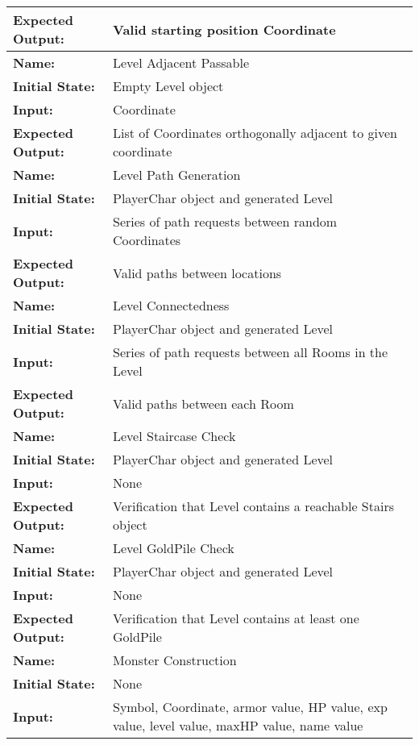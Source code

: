 \documentclass[12pt, titlepage]{article}
\begin{document}
\begin{center}
\begin{longtable}{ l | p{10cm} }
				\textbf{Expected Output:} & Valid starting position Coordinate\\[0.6em]
				\hline
				\rule{0pt}{1.5em}\textbf{Name:} & Level Adjacent Passable\\
				\textbf{Initial State:} & Empty Level object\\
				\textbf{Input:} & Coordinate\\
				\textbf{Expected Output:} & List of Coordinates orthogonally adjacent to given coordinate\\[0.6em]
				\hline
				\rule{0pt}{1.5em}\textbf{Name:} & Level Path Generation\\
				\textbf{Initial State:} & PlayerChar object and generated Level\\
				\textbf{Input:} & Series of path requests between random Coordinates\\
				\textbf{Expected Output:} & Valid paths between locations\\[0.6em]
				\hline
				\rule{0pt}{1.5em}\textbf{Name:} & Level Connectedness\\
				\textbf{Initial State:} & PlayerChar object and generated Level\\
				\textbf{Input:} & Series of path requests between all Rooms in the Level\\
				\textbf{Expected Output:} & Valid paths between each Room\\[0.6em]
				\hline
				\rule{0pt}{1.5em}\textbf{Name:} & Level Staircase Check\\
				\textbf{Initial State:} & PlayerChar object and generated Level\\
				\textbf{Input:} & None\\
				\textbf{Expected Output:} & Verification that Level contains a reachable Stairs object\\[0.6em]
				\hline
				\rule{0pt}{1.5em}\textbf{Name:} & Level GoldPile Check\\
				\textbf{Initial State:} & PlayerChar object and generated Level\\
				\textbf{Input:} & None\\
				\textbf{Expected Output:} & Verification that Level contains at least one GoldPile\\[0.6em]
				\hline
				\rule{0pt}{1.5em}\textbf{Name:} & Monster Construction\\
				\textbf{Initial State:} & None\\
				\textbf{Input:} & Symbol, Coordinate, armor value, HP value, exp value, level value, maxHP value, name value\\

\end{longtable}
\end{center}
\end{document}

